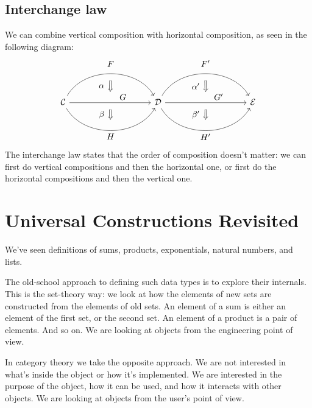 \documentclass[DaoFP]{subfiles}
\begin{document}
\subsection{Interchange law}
We can combine vertical composition with horizontal composition, as seen in the following diagram:
\[
\begin{tikzcd}[column sep=huge]
\mathcal{C}
  \arrow[bend left=60]{rr}[name=U, label=above:$F$]{}
  \arrow[]{rr}[name=M, label={[xshift=15pt, yshift=-5pt]:$G$}]{} 
  \arrow[bend right=60]{rr}[name=D, label=below:$H$]{} 
 &&
\mathcal{D}
  \arrow[bend left=60]{rr}[name=U1, label=above:$F'$]{}
  \arrow[]{rr}[name=M1, label={[xshift=15pt, yshift=-5pt]:$G'$}]{} 
  \arrow[bend right=60]{rr}[name=D1, label=below:$H'$]{} 
&&
\mathcal{E}
  \arrow[shorten <=8pt, shorten >=8pt,Rightarrow, to path={(U) -- node[label=left:$\alpha$] {} (M)}]{}
  \arrow[shorten <=8pt, shorten >=8pt,Rightarrow, to path={(M) -- node[label=left:$\beta$] {} (D)}]{}
  \arrow[shorten <=8pt, shorten >=8pt,Rightarrow, to path={(U1) -- node[label=left:$\alpha'$] {} (M1)}]{}
  \arrow[shorten <=8pt, shorten >=8pt,Rightarrow, to path={(M1) -- node[label=left:$\beta'$] {} (D1)}]{}
\end{tikzcd}
\]
The interchange law states that the order of composition doesn't matter: we can first do vertical compositions and then the horizontal one, or first do the horizontal compositions and then the vertical one.

\section{Universal Constructions Revisited}

We've seen definitions of sums, products, exponentials, natural numbers, and lists. 

The old-school approach to defining such data types is to explore their internals. This is the set-theory way: we look at how the elements of new sets are constructed from the elements of old sets. An element of a sum is either an element of the first set, or the second set. An element of a product is a pair of elements. And so on. We are looking at objects from the engineering point of view.

In category theory we take the opposite approach. We are not interested in what's inside the object or how it's implemented. We are interested in the purpose of the object, how it can be used, and how it interacts with other objects. We are looking at objects from the user's point of view.
\end{document}
